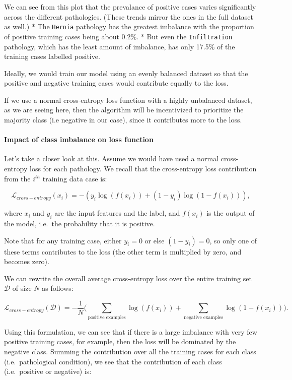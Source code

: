 \documentclass[11pt]{article}
\begin{document}
    We can see from this plot that the prevalance of positive cases varies
significantly across the different pathologies. (These trends mirror the
ones in the full dataset as well.) * The \texttt{Hernia} pathology has
the greatest imbalance with the proportion of positive training cases
being about 0.2\%. * But even the \texttt{Infiltration} pathology, which
has the least amount of imbalance, has only 17.5\% of the training cases
labelled positive.

Ideally, we would train our model using an evenly balanced dataset so
that the positive and negative training cases would contribute equally
to the loss.

If we use a normal cross-entropy loss function with a highly unbalanced
dataset, as we are seeing here, then the algorithm will be incentivized
to prioritize the majority class (i.e negative in our case), since it
contributes more to the loss.

    \hypertarget{impact-of-class-imbalance-on-loss-function}{%
\paragraph{Impact of class imbalance on loss
function}\label{impact-of-class-imbalance-on-loss-function}}

Let's take a closer look at this. Assume we would have used a normal
cross-entropy loss for each pathology. We recall that the cross-entropy
loss contribution from the \(i^{th}\) training data case is:

\[\mathcal{L}_{cross-entropy}(x_i) = -(y_i \log(f(x_i)) + (1-y_i) \log(1-f(x_i))),\]

where \(x_i\) and \(y_i\) are the input features and the label, and
\(f(x_i)\) is the output of the model, i.e.~the probability that it is
positive.

Note that for any training case, either \(y_i=0\) or else \((1-y_i)=0\),
so only one of these terms contributes to the loss (the other term is
multiplied by zero, and becomes zero).

We can rewrite the overall average cross-entropy loss over the entire
training set \(\mathcal{D}\) of size \(N\) as follows:

\[\mathcal{L}_{cross-entropy}(\mathcal{D}) = - \frac{1}{N}\big( \sum_{\text{positive examples}} \log (f(x_i)) + \sum_{\text{negative examples}} \log(1-f(x_i)) \big).\]

Using this formulation, we can see that if there is a large imbalance
with very few positive training cases, for example, then the loss will
be dominated by the negative class. Summing the contribution over all
the training cases for each class (i.e.~pathological condition), we see
that the contribution of each class (i.e.~positive or negative) is:
\end{document}
